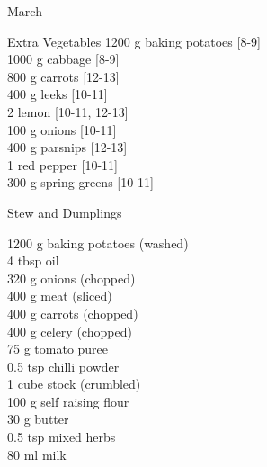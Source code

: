 \begin{menu}{March}
      \begin{shoppinglist}{Extra Vegetables}
      1200 g baking potatoes {\scriptsize[8-9]}\\
      1000 g cabbage {\scriptsize[8-9]}\\
      800 g carrots {\scriptsize[12-13]}\\
      400 g leeks {\scriptsize[10-11]}\\
      2  lemon {\scriptsize[10-11, 12-13]}\\
      100 g onions {\scriptsize[10-11]}\\
      400 g parsnips {\scriptsize[12-13]}\\
      1  red pepper {\scriptsize[10-11]}\\
      300 g spring greens {\scriptsize[10-11]}\\
      \end{shoppinglist}%
      \par\vfil %
    \vfil\clearpage
  
    \begin{recipe}{2}{Stew and Dumplings}%
		\begin{ingredients}
		1200 g baking potatoes (washed) \\
	4 tbsp oil  \\
	320 g onions (chopped) \\
	400 g meat (sliced) \\
	400 g carrots (chopped) \\
	400 g celery (chopped) \\
	75 g tomato puree  \\
	0.5 tsp chilli powder  \\
	1 cube stock (crumbled) \\
	100 g self raising flour  \\
	30 g butter  \\
	0.5 tsp mixed herbs  \\
	80 ml milk  \\
	
		\end{ingredients}
	
	

\end{recipe}
\end{menu}
